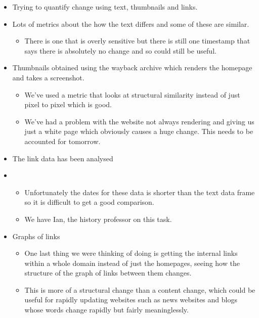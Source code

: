 \documentclass[10pt]{beamer}
\begin{document}
\begin{frame}

\begin{itemize}
\item Trying to quantify change using text, thumbnails and links.
\item Lots of metrics about the how the text differs and some of these are similar.
\begin{itemize}
\item There is one that is overly sensitive but there is still one timestamp that says there is absolutely no change and so could still be useful.
\end{itemize}  
\item Thumbnails obtained using the wayback archive which renders the homepage and takes a screenshot.
\begin{itemize}
\item We've used a metric that looks at structural similarity instead of just pixel to pixel which is good. 
\item We've had a problem with the website not always rendering and giving us just a white page which obviously causes a huge change. This needs to be accounted for tomorrow.
\end{itemize}
\end{itemize}
\end{frame}

\begin{frame}
\begin{itemize}
\item The link data has been analysed
\item \begin{itemize}
\item Unfortunately the dates for these data is shorter than the text data frame so it is difficult to get a good comparison. 
\item We have Ian, the history professor on this task.
\end{itemize}
\item Graphs of links
\begin{itemize}
\item One last thing we were thinking of doing is getting the internal links within a whole domain instead of just the homepages, seeing how the structure of the graph of links between them changes.
\item This is more of a structural change than a content change, which could be useful for rapidly updating websites such as news websites and blogs whose words change rapidly but fairly meaninglessly.
\end{itemize}
\end{itemize}

\end{frame}
\end{document}

